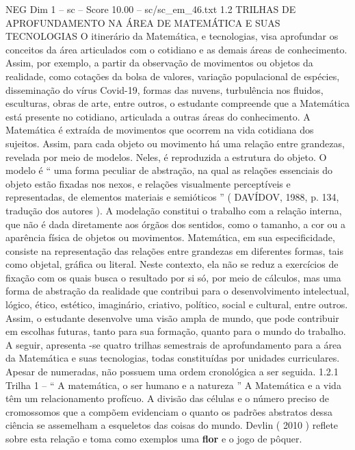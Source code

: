 \begin{textsample}{NEG Dim 1 – sc – Score 10.00 – sc/sc\_em\_46.txt}  \label{ex:f1_neg_280}
1.2 TRILHAS DE APROFUNDAMENTO NA ÁREA DE MATEMÁTICA E SUAS TECNOLOGIAS O itinerário da Matemática, e tecnologias, visa aprofundar os conceitos da área articulados com o cotidiano e as demais áreas de conhecimento.
Assim, por exemplo, a partir da observação de movimentos ou objetos da realidade, como cotações da bolsa de valores, variação populacional de espécies, disseminação do vírus Covid-19, formas das nuvens, turbulência nos fluidos, esculturas, obras de arte, entre outros, o estudante compreende que a Matemática está presente no cotidiano, articulada a outras áreas do conhecimento.
A Matemática é extraída de movimentos que ocorrem na vida cotidiana dos sujeitos.
Assim, para cada objeto ou movimento há uma relação entre grandezas, revelada por meio de modelos.
Neles, é reproduzida a estrutura do objeto.
O modelo é “ uma forma peculiar de abstração, na qual as relações essenciais do objeto estão fixadas nos nexos, e relações visualmente perceptíveis e representadas, de elementos materiais e semióticos ” ( DAVÍDOV, 1988, p. 134, tradução dos autores ).
A modelação constitui o trabalho com a relação interna, que não é dada diretamente aos órgãos dos sentidos, como o tamanho, a cor ou a aparência física de objetos ou movimentos.
Matemática, em sua especificidade, consiste na representação das relações entre grandezas em diferentes formas, tais como objetal, gráfica ou literal.
Neste contexto, ela não se reduz a exercícios de fixação com os quais busca o resultado por si só, por meio de cálculos, mas uma forma de abstração da realidade que contribui para o desenvolvimento intelectual, lógico, ético, estético, imaginário, criativo, político, social e cultural, entre outros.
Assim, o estudante desenvolve uma visão ampla de mundo, que pode contribuir em escolhas futuras, tanto para sua formação, quanto para o mundo do trabalho.
A seguir, apresenta -se quatro trilhas semestrais de aprofundamento para a área da Matemática e suas tecnologias, todas constituídas por unidades curriculares.
Apesar de numeradas, não possuem uma ordem cronológica a ser seguida. 1.2.1 Trilha 1 – “ A matemática, o ser humano e a natureza ” A Matemática e a vida têm um relacionamento profícuo.
A divisão das células e o número preciso de cromossomos que a compõem evidenciam o quanto os padrões abstratos dessa ciência se assemelham a esqueletos das coisas do mundo.
Devlin ( 2010 ) reflete sobre esta relação e toma como exemplos uma \textbf{flor} e o jogo de pôquer.

\end{textsample}
